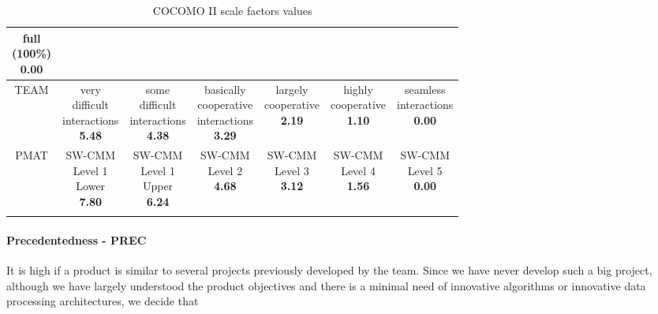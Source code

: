 {\begin{longtable}{c|cccccc}
\specialcell{full\\(100\%)\\\textbf{0.00}} \\
\midrule
TEAM &
\specialcell{very\\difficult\\interactions\\\textbf{5.48}} & 
\specialcell{some\\difficult\\interactions\\\textbf{4.38}} & 
\specialcell{basically\\cooperative\\interactions\\\textbf{3.29}} & 
\specialcell{largely\\cooperative\\\textbf{2.19}} & 
\specialcell{highly\\cooperative\\\textbf{1.10}} & 
\specialcell{seamless\\interactions\\\textbf{0.00}} \\
\midrule
PMAT &
\specialcell{SW-CMM\\Level 1\\Lower\\\textbf{7.80}} & 
\specialcell{SW-CMM\\Level 1\\Upper\\\textbf{6.24}} & 
\specialcell{SW-CMM\\Level 2\\\textbf{4.68}} & 
\specialcell{SW-CMM\\Level 3\\\textbf{3.12}} & 
\specialcell{SW-CMM\\Level 4\\\textbf{1.56}} & 
\specialcell{SW-CMM\\Level 5\\\textbf{0.00}} \\
\bottomrule
\caption{\label{tbl:cocomoSF}COCOMO II scale factors values}
\end{longtable}
}

\paragraph{Precedentedness - PREC} It is high if a product is similar to several projects previously developed by the team. Since we have never develop such a big project, although we have largely understood the product objectives and there is a minimal need of innovative algorithms or innovative data processing architectures, we decide that


